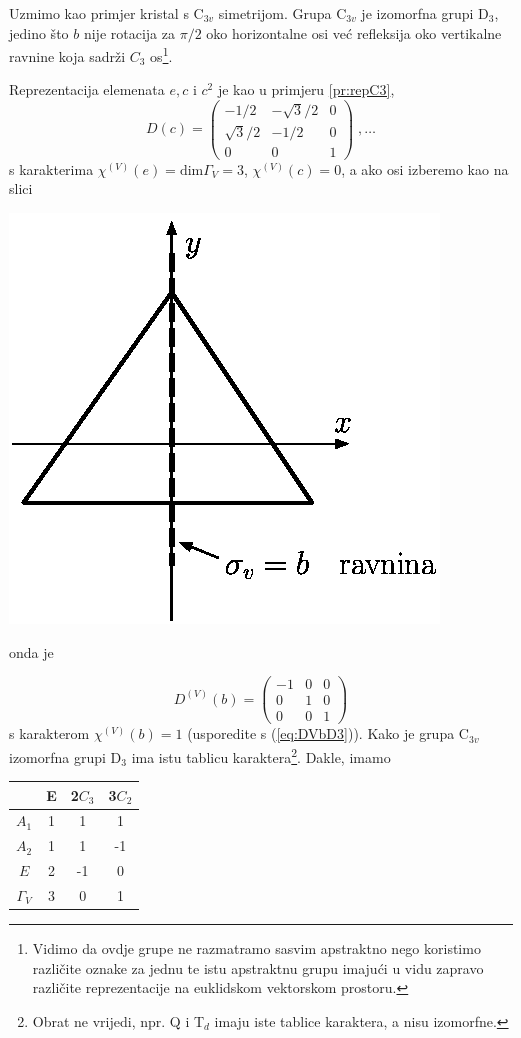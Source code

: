 Uzmimo kao primjer kristal s C$_{3v}$ simetrijom.
Grupa C$_{3v}$ je izomorfna grupi D$_3$, jedino što $b$ nije rotacija
za $\pi/2$ oko horizontalne osi već refleksija oko vertikalne ravnine
koja sadrži $C_3$ os\footnote{Vidimo da ovdje grupe ne razmatramo sasvim 
apstraktno nego koristimo različite oznake za jednu te istu apstraktnu
grupu imajući u vidu zapravo različite reprezentacije na euklidskom
vektorskom prostoru.}.

Reprezentacija elemenata $e, c$ i  $c^2$ je kao u primjeru \ref{pr:repC3},
\begin{displaymath}
D(c)=
\left(
\begin{array}{ccc}
-1/2 & -\sqrt{3}/2 & 0 \\
\sqrt{3}/2 & -1/2 & 0 \\
0 & 0 & 1
\end{array}\right) \;, \ldots
\end{displaymath}
s karakterima $\chi^{(V)}(e)=\mbox{dim}\Gamma_{V}=3$, $\chi^{(V)}(c)=0$,
a ako osi izberemo kao na slici

\centerline{\includegraphics[scale=0.8]{pics/C3vravnina.eps}}

onda je 

\begin{displaymath}
D^{(V)}(b)=
\begin{pmatrix}
-1 & 0 & 0 \\
0 & 1 & 0 \\
0 & 0 & 1
\end{pmatrix}
\end{displaymath}
s karakterom $\chi^{(V)}(b)=1$ (usporedite s (\ref{eq:DVbD3})).
Kako je grupa C$_{3v}$ izomorfna grupi D$_3$ ima istu tablicu karaktera\footnote{Obrat
ne vrijedi, npr. Q i T$_d$ imaju iste tablice karaktera, a nisu izomorfne.}. Dakle,
imamo
\begin{center}
\begin{tabular}{c|ccc}
  & E & 2$C_3$  & 3$C_2$ \\ \hline
$A_1$ & 1 & 1& 1 \\
$A_2$ & 1 & 1&-1 \\
 $E$  & 2 &-1& 0 \\ \hline
 $\Gamma_V$ & 3 & 0 & 1
\end{tabular}
\end{center}


